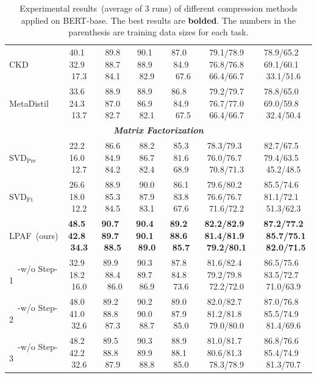 \begin{table}[thb!]
\begin{tabular}{|l|cccccc|}
		CKD   &40.1~ 32.9~ 17.3   & 89.8 ~88.7~ 84.1          & 90.1~ 88.9~ 82.9          & 87.0~ 84.9 ~67.6          & 79.1/78.9 ~76.8/76.8~ 66.4/66.7          &78.9/65.2~ 69.1/60.1~ 33.1/51.6                            \\
		MetaDistil  &33.6~ 24.3~ 13.7    & 88.9 ~87.0~ 82.7          & 88.9~ 86.9~ 82.1          & 86.8~ 84.9 ~67.5          & 79.2/79.7 ~76.7/77.0~ 66.4/66.7          &78.8/65.0~ 69.0/59.8~ 32.4/50.4                           \\
		\hline
		\multicolumn{7}{|c|}{\textit{\textbf{Matrix Factorization}}}   \\
		\hline
		SVD$_{\text{Pre}}$  &22.2~ 16.0~ 12.7    & 86.6 ~84.9~ 84.2         & 88.2 ~86.7~ 82.4          & 85.3 ~81.6~ 68.9          & 78.3/79.3~ 76.0/76.7~ 70.8/71.3          & 82.7/67.5~ 79.4/63.5~ 45.2/48.5      \\
		SVD$_{\text{Ft}}$  &26.6~ 18.0~ 12.2    & 88.9 ~85.3~ 84.5         & 90.0 ~87.9~ 83.1          & 86.1 ~83.8~ 67.6          & 79.6/80.2~ 76.6/76.7~ 71.6/72.2          & 85.5/74.6~ 81.1/72.1~ 51.3/62.3     \\
		LPAF~(ours)   &\textbf{48.5~ 42.8~ 34.3}     & \textbf{90.7~ 89.7~ 88.5} & \textbf{90.4}~ \textbf{90.1}~ \textbf{89.0} & \textbf{89.2~ 88.6~ 85.7} & \textbf{82.2/82.9}~ \textbf{81.4/81.9}~ \textbf{79.2/80.1} & \textbf{87.2/77.2 ~85.7/75.1 ~82.0/71.5} \\
		~~-w/o Step-1    &32.9~ 18.2~ 16.0    &89.9~ 88.4 ~86.0 &90.3~ 89.7~ 86.9 &87.8~ 84.8~ 73.6 &81.6/82.4~ 79.2/79.8~ 72.2/72.0 &86.5/75.6~ 83.5/72.7~ 71.0/63.9  \\
		~~-w/o Step-2     &48.0~ 41.0~ 32.6   &89.2~ 88.8~ 87.3 &90.2~ 90.0~ 88.7 &89.0~ 87.9~ 85.0 &82.0/82.7~ 81.2/81.8~ 79.0/80.0 &87.0/76.8~ 85.5/74.9~ 81.4/69.6 \\
		~~-w/o Step-3    &48.2~ 42.2~ 32.6     &89.5~ 88.8~ 87.9 &90.3~ 89.9~ 88.8 &88.9~ 88.1~ 85.0 &81.0/81.7~ 80.6/81.3~ 78.3/78.9 &86.8/76.6~ 85.4/74.9~ 81.3/70.7\\
		\hline
	\end{tabular}
	\caption{Experimental results~(average of 3 runs) of different compression methods applied on BERT-base. The best results are \textbf{bolded}. The numbers in the parenthesis are training data sizes for each task.}
	\label{table:all}
\end{table}
